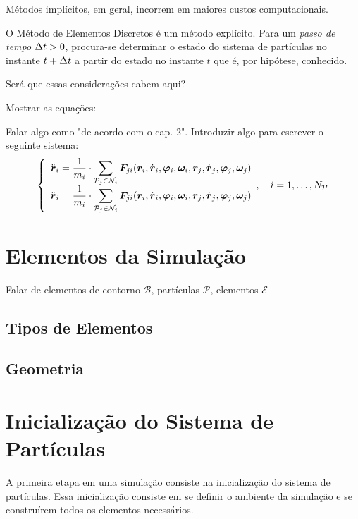 Métodos implícitos, em geral, incorrem em maiores custos computacionais. 

O Método de Elementos Discretos é um método explícito. Para um \textit{passo de tempo} \(\Delta t>0\), procura-se determinar o estado do sistema de partículas no instante \(t+\Delta t\) a partir do estado no instante \(t\) que é, por hipótese, conhecido.

\alert{Será que essas considerações cabem aqui?}

\alert{Mostrar as equações:}

\alert{Falar algo como "de acordo com o cap. 2".}
\alert{Introduzir algo para escrever o seguinte sistema:}
\begin{equation*}
	\left\lbrace
		\begin{array}{l}
			\accelerationi = \inverted{\massi}\cdot\dsum_{\particlej\in\neighborhoodi} \forceji\pqty{\positioni, \velocityi, \orientationi, \angularVelocityi, \positionj, \velocityj, \orientationj, \angularVelocityj}
			\\
			\accelerationi = \inverted{\massi}\cdot\dsum_{\particlej\in\neighborhoodi} \forceji\pqty{\positioni, \velocityi, \orientationi, \angularVelocityi, \positionj, \velocityj, \orientationj, \angularVelocityj}
		\end{array},\quad i = 1, \dotsc, \numberOfParticles
	\right.
\end{equation*}

\section{Elementos da Simulação}

\alert{Falar de elementos de contorno \(\mathcal{B}\), partículas \(\mathcal{P}\), elementos \(\mathcal{E}\)}

\subsection{Tipos de Elementos}
\subsection{Geometria}

\section{Inicialização do Sistema de Partículas}

A primeira etapa em uma simulação \DEM{} consiste na inicialização do sistema de partículas. Essa inicialização consiste em se definir o ambiente da simulação e se construírem todos os elementos necessários.

